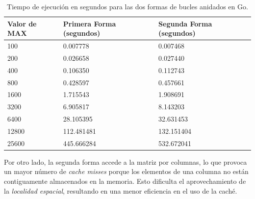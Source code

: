 \documentclass[conference]{IEEEtran}
\begin{document}
\begin{table}[h!]
    \centering
    \begin{tabularx}{250pt}{|X|X|X|}
        \hline
        \textbf{Valor de MAX} & \textbf{Primera Forma (segundos)} & \textbf{Segunda Forma (segundos)} \\ \hline
        100                   & 0.007778                          & 0.007468                          \\ \hline
        200                   & 0.026658                          & 0.027440                          \\ \hline
        400                   & 0.106350                          & 0.112743                          \\ \hline
        800                   & 0.428597                          & 0.457661                          \\ \hline
        1600                  & 1.715543                          & 1.908691                          \\ \hline
        3200                  & 6.905817                          & 8.143203                          \\ \hline
        6400                  & 28.105395                         & 32.631453                         \\ \hline
        12800                 & 112.481481                        & 132.151404                        \\ \hline
        25600                 & 445.666284                        & 532.672041                        \\ \hline
    \end{tabularx}
    \caption{Tiempo de ejecución en segundos para las dos formas de bucles anidados en Go.}
    \label{tabla_go}
\end{table}

Por otro lado, la segunda forma accede a la matriz por columnas, lo que provoca un mayor
número de \textit{cache misses} porque los elementos de una columna no están contiguamente
almacenados en la memoria. Esto dificulta el aprovechamiento de la \textit{localidad espacial},
resultando en una menor eficiencia en el uso de la caché.
\end{document}

